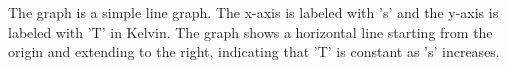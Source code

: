 The graph is a simple line graph. The x-axis is labeled with 's' and the y-axis is labeled with 'T' in Kelvin. The graph shows a horizontal line starting from the origin and extending to the right, indicating that 'T' is constant as 's' increases.